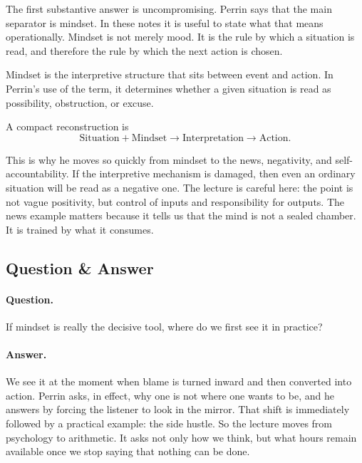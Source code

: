 The first substantive answer is uncompromising. Perrin says that the main separator is mindset. In these notes it is useful to state what that means operationally. Mindset is not merely mood. It is the rule by which a situation is read, and therefore the rule by which the next action is chosen.

\begin{definition}
Mindset is the interpretive structure that sits between event and action. In Perrin's use of the term, it determines whether a given situation is read as possibility, obstruction, or excuse.
\end{definition}

A compact reconstruction is
\begin{equation}
\text{Situation} + \text{Mindset} \to \text{Interpretation} \to \text{Action}.
\end{equation}

This is why he moves so quickly from mindset to the news, negativity, and self-accountability. If the interpretive mechanism is damaged, then even an ordinary situation will be read as a negative one. The lecture is careful here: the point is not vague positivity, but control of inputs and responsibility for outputs. The news example matters because it tells us that the mind is not a sealed chamber. It is trained by what it consumes.

\subsection{Question \& Answer}

\paragraph{Question.} If mindset is really the decisive tool, where do we first see it in practice?

\paragraph{Answer.} We see it at the moment when blame is turned inward and then converted into action. Perrin asks, in effect, why one is not where one wants to be, and he answers by forcing the listener to look in the mirror. That shift is immediately followed by a practical example: the side hustle. So the lecture moves from psychology to arithmetic. It asks not only how we think, but what hours remain available once we stop saying that nothing can be done.

